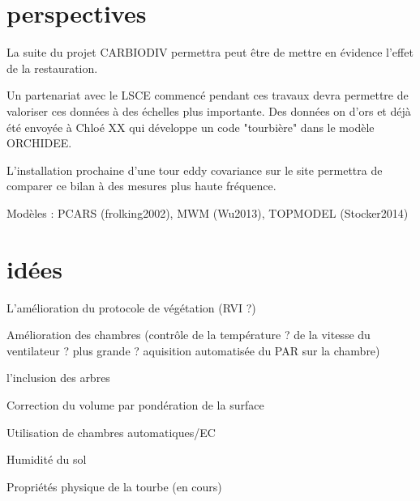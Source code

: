 \section{perspectives}

La suite du projet CARBIODIV permettra peut être de mettre en évidence l'effet de la restauration.

Un partenariat avec le LSCE commencé pendant ces travaux devra permettre de valoriser ces données à des échelles plus importante.
Des données on d'ors et déjà été envoyée à Chloé XX qui développe un code "tourbière" dans le modèle ORCHIDEE.

L'installation prochaine d'une tour eddy covariance sur le site permettra de comparer ce bilan à des mesures plus haute fréquence.

Modèles : PCARS (frolking2002), MWM (Wu2013), TOPMODEL (Stocker2014)


\section{idées}

L'amélioration du protocole de végétation (RVI ?)

Amélioration des chambres (contrôle de la température ? de la vitesse du ventilateur ? plus grande ? aquisition automatisée du PAR sur la chambre)

l'inclusion des arbres

Correction du volume par pondération de la surface

Utilisation de chambres automatiques/EC

Humidité du sol

Propriétés physique de la tourbe (en cours)

